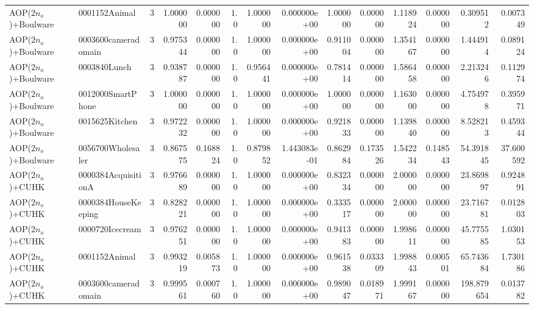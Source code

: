 \begin{tabular}{llrr|r|rr|rr|rr|rrr}
    AOP($2 n_o$)+Boulware &          0001152Animal &       3 & 1.000000 & 0.000000 &  1.0 &      1.000000 & 0.000000e+00 &      1.000000 & 0.000000 &      1.118924 &    0.000000 &     0.309512 &    0.007349 \\
    AOP($2 n_o$)+Boulware &    0003600cameradomain &       3 & 0.975344 & 0.000000 &  1.0 &      1.000000 & 0.000000e+00 &      0.911004 & 0.000000 &      1.354167 &    0.000000 &     1.444914 &    0.089124 \\
    AOP($2 n_o$)+Boulware &           0003840Lunch &       3 & 0.938787 & 0.000000 &  1.0 &      0.956441 & 0.000000e+00 &      0.781414 & 0.000000 &      1.586458 &    0.000000 &     2.213246 &    0.112974 \\
    AOP($2 n_o$)+Boulware &      0012000SmartPhone &       3 & 1.000000 & 0.000000 &  1.0 &      1.000000 & 0.000000e+00 &      1.000000 & 0.000000 &      1.163000 &    0.000000 &     4.754978 &    0.395971 \\
    AOP($2 n_o$)+Boulware &         0015625Kitchen &       3 & 0.972232 & 0.000000 &  1.0 &      1.000000 & 0.000000e+00 &      0.921833 & 0.000000 &      1.139840 &    0.000000 &     8.528213 &    0.459344 \\
    AOP($2 n_o$)+Boulware &      0056700Wholesaler &       3 & 0.867575 & 0.168824 &  1.0 &      0.879852 & 1.443083e-01 &      0.862984 & 0.173526 &      1.542234 &    0.148543 &    54.391845 &   37.600592 \\
        AOP($2 n_o$)+CUHK &    0000384AcquisitionA &       3 & 0.976689 & 0.000000 &  1.0 &      1.000000 & 0.000000e+00 &      0.832334 & 0.000000 &      2.000000 &    0.000000 &    23.869897 &    0.924891 \\
        AOP($2 n_o$)+CUHK &    0000384HouseKeeping &       3 & 0.828221 & 0.000000 &  1.0 &      1.000000 & 0.000000e+00 &      0.333517 & 0.000000 &      2.000000 &    0.000000 &    23.716781 &    0.012803 \\
        AOP($2 n_o$)+CUHK &        0000720Icecream &       3 & 0.976251 & 0.000000 &  1.0 &      1.000000 & 0.000000e+00 &      0.941383 & 0.000000 &      1.998611 &    0.000000 &    45.775585 &    1.030153 \\
        AOP($2 n_o$)+CUHK &          0001152Animal &       3 & 0.993219 & 0.005873 &  1.0 &      1.000000 & 0.000000e+00 &      0.961538 & 0.033309 &      1.998843 &    0.000501 &    65.743684 &    1.730186 \\
        AOP($2 n_o$)+CUHK &    0003600cameradomain &       3 & 0.999561 & 0.000760 &  1.0 &      1.000000 & 0.000000e+00 &      0.989047 & 0.018971 &      1.999167 &    0.000000 &   198.879654 &    0.013782 \\

\end{tabular}
